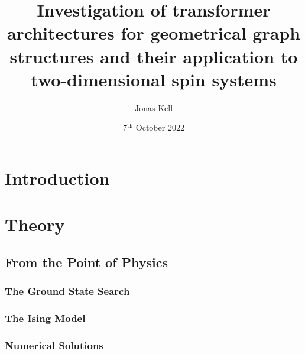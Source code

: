 \documentclass[
headings=optiontohead,              %
12pt,                               %
DIV=13,                             %
twoside=false,                      %
open=right,                         %
BCOR=10mm,                          %
toc=bibliographynumbered            %
]{scrreport}
\title{Investigation of transformer architectures for geometrical graph structures and their application to two-dimensional spin systems} %
\author{Jonas Kell}
\date{7$^\text{th}$ October 2022}
\begin{document}
\thispagestyle{empty}                           %
\cleardoublepage                                %
\pagestyle{scrheadings}                         %
\renewcommand{\contentsname}{Table of Contents} %
\tableofcontents                                %
\cleardoublepage                                %

\clearpairofpagestyles
\ihead{\leftmark}
\ohead{\Ifstr{\leftmark}{\rightmark}{}{\rightmark}}
\cfoot*{\pagemark}


\chapter{Introduction}

\chapter{Theory}
    
    \FloatBarrier
    \section{From the Point of Physics}
        \subsection{The Ground State Search}
        \subsection{The Ising Model}
        \subsection{Numerical Solutions}
\end{document}
